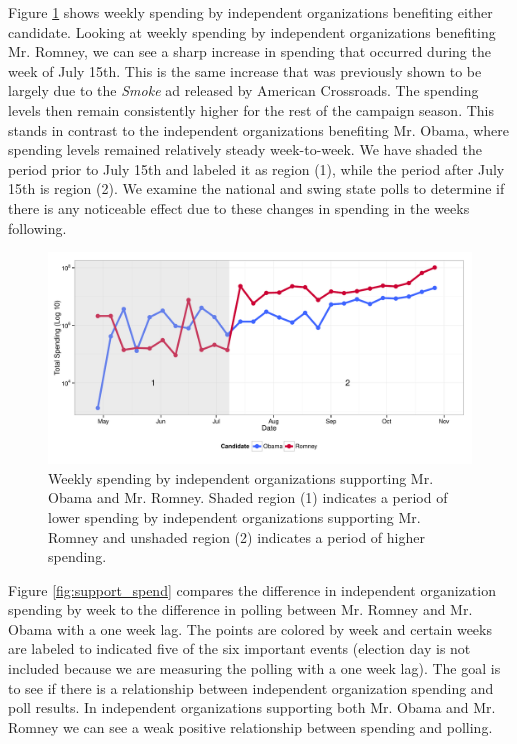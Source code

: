 \documentclass[11pt]{article}\usepackage{graphicx, color}
\newenvironment{knitrout}{}{} %
\begin{document}
Figure \ref{fig:trend_plot} shows weekly spending by independent organizations benefiting either candidate. Looking at weekly spending by independent organizations benefiting Mr. Romney, we can see a sharp increase in spending that occurred during the week of July 15th. This is the same increase that was previously shown to be largely due to the \textit{Smoke} ad released by American Crossroads. The spending levels then remain consistently higher for the rest of the campaign season. This stands in contrast to the independent organizations benefiting Mr. Obama, where spending levels remained relatively steady week-to-week. We have shaded the period prior to July 15th and labeled it as region (1), while the period after July 15th is region (2). We examine the national and swing state polls to determine if there is any noticeable effect due to these changes in spending in the weeks following.

\begin{knitrout}
\color{fgcolor}\begin{figure}[H]


{\centering \includegraphics[width=\textwidth]{figure/trend_plot} 

}

\caption[Weekly spending by independent organizations supporting Mr]{Weekly spending by independent organizations supporting Mr. Obama and Mr. Romney. Shaded region (1) indicates a period of lower spending by independent organizations supporting Mr. Romney and unshaded region (2) indicates a period of higher spending.\label{fig:trend_plot}}
\end{figure}


\end{knitrout}


Figure \ref{fig:support_spend} compares the difference in independent organization spending by week to the difference in polling between Mr. Romney and Mr. Obama with a one week lag. The points are colored by week and certain weeks are labeled to indicated five of the six important events (election day is not included because we are measuring the polling with a one week lag). The goal is to see if there is a relationship between independent organization spending and poll results. In independent organizations supporting both Mr. Obama and Mr. Romney we can see a weak positive relationship between spending and polling.
\end{document}
